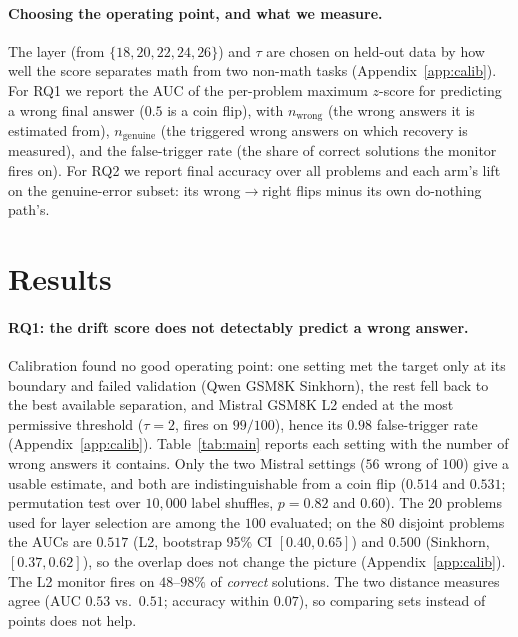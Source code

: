 \documentclass{article}
\begin{document}
\paragraph{Choosing the operating point, and what we measure.}
The layer (from $\{18,20,22,24,26\}$) and $\tau$ are chosen on held-out data by how well the score separates math from two non-math tasks (Appendix~\ref{app:calib}). For RQ1 we report the AUC of the per-problem maximum $z$-score for predicting a wrong final answer ($0.5$ is a coin flip), with $n_{\text{wrong}}$ (the wrong answers it is estimated from), $n_{\text{genuine}}$ (the triggered wrong answers on which recovery is measured), and the false-trigger rate (the share of correct solutions the monitor fires on). For RQ2 we report final accuracy over all problems and each arm's lift on the genuine-error subset: its wrong$\to$right flips minus its own do-nothing path's.

\section{Results}
\label{sec:results}

\paragraph{RQ1: the drift score does not detectably predict a wrong answer.}
Calibration found no good operating point: one setting met the target only at its boundary and failed validation (Qwen GSM8K Sinkhorn), the rest fell back to the best available separation, and Mistral GSM8K L2 ended at the most permissive threshold ($\tau=2$, fires on $99/100$), hence its $0.98$ false-trigger rate (Appendix~\ref{app:calib}). {Table~\ref{tab:main} reports each setting with the number of wrong answers it contains.} Only the two Mistral settings ($56$ wrong of $100$) give a usable estimate, and both are indistinguishable from a coin flip ($0.514$ and $0.531$; permutation test over $10{,}000$ label shuffles, $p=0.82$ and $0.60$). The $20$ problems used for layer selection are among the $100$ evaluated; on the $80$ disjoint problems the AUCs are $0.517$ (L2, bootstrap 95\% CI $[0.40,0.65]$) and $0.500$ (Sinkhorn, $[0.37,0.62]$), so the overlap does not change the picture (Appendix~\ref{app:calib}). The L2 monitor fires on $48$--$98\%$ of \emph{correct} solutions. The two distance measures agree (AUC $0.53$ vs.\ $0.51$; {accuracy within $0.07$}), so comparing sets instead of points does not help.
\end{document}
